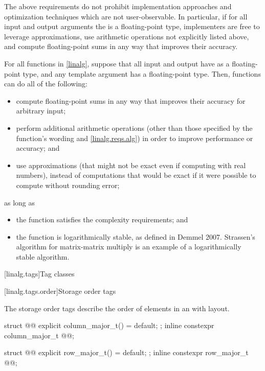 \begin{note}
The above requirements do not prohibit
implementation approaches and optimization techniques
which are not user-observable.
In particular, if for all input and output arguments
the  is a floating-point type,
implementers are free to leverage approximations,
use arithmetic operations not explicitly listed above, and
compute floating-point sums in any way that improves their accuracy.
\end{note}

\pnum
\begin{note}
For all functions in \ref{linalg},
suppose that all input and output  have as 
a floating-point type, and
any  template argument has a floating-point type.
Then, functions can do all of the following:
\begin{itemize}
\item
compute floating-point sums in any way
that improves their accuracy for arbitrary input;
\item
perform additional arithmetic operations
(other than those specified by the function's wording and \ref{linalg.reqs.alg})
in order to improve performance or accuracy; and
\item
use approximations
(that might not be exact even if computing with real numbers),
instead of computations that would be exact
if it were possible to compute without rounding error;
\end{itemize}
as long as
\begin{itemize}
\item
the function satisfies the complexity requirements; and
\item
the function is logarithmically stable,
as defined in Demmel 2007\supercite{linalg-stable}.
Strassen's algorithm for matrix-matrix multiply
is an example of a logarithmically stable algorithm.
\end{itemize}
\end{note}

[linalg.tags]{Tag classes}

[linalg.tags.order]{Storage order tags}

\pnum
The storage order tags describe
the order of elements in an  with
 layout.
\begin{itemdecl}
struct @@ {
  explicit column_major_t() = default;
};
inline constexpr column_major_t @@{};

struct @@ {
  explicit row_major_t() = default;
};
inline constexpr row_major_t @@{};
\end{itemdecl}

